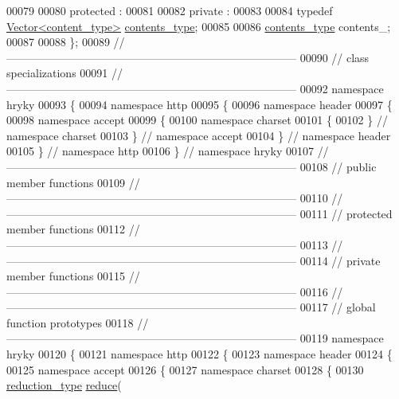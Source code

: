 \begin{DoxyCode}
00079 
00080 \textcolor{keyword}{protected} :
00081 
00082 \textcolor{keyword}{private} :
00083 
00084     \textcolor{keyword}{typedef} \hyperlink{classhryky_1_1_vector}{Vector<content_type>} \hyperlink{classhryky_1_1_vector}{contents_type};
00085 
00086     \hyperlink{classhryky_1_1_vector}{contents_type} contents\_;
00087 
00088 \};
00089 \textcolor{comment}{//
      ------------------------------------------------------------------------------}
00090 \textcolor{comment}{// class specializations}
00091 \textcolor{comment}{//
      ------------------------------------------------------------------------------}
00092 \textcolor{keyword}{namespace }hryky
00093 \{
00094 \textcolor{keyword}{namespace }http
00095 \{
00096 \textcolor{keyword}{namespace }header
00097 \{
00098 \textcolor{keyword}{namespace }accept
00099 \{
00100 \textcolor{keyword}{namespace }charset
00101 \{
00102 \} \textcolor{comment}{// namespace charset}
00103 \} \textcolor{comment}{// namespace accept}
00104 \} \textcolor{comment}{// namespace header}
00105 \} \textcolor{comment}{// namespace http}
00106 \} \textcolor{comment}{// namespace hryky}
00107 \textcolor{comment}{//
      ------------------------------------------------------------------------------}
00108 \textcolor{comment}{// public member functions}
00109 \textcolor{comment}{//
      ------------------------------------------------------------------------------}
00110 \textcolor{comment}{//
      ------------------------------------------------------------------------------}
00111 \textcolor{comment}{// protected member functions}
00112 \textcolor{comment}{//
      ------------------------------------------------------------------------------}
00113 \textcolor{comment}{//
      ------------------------------------------------------------------------------}
00114 \textcolor{comment}{// private member functions}
00115 \textcolor{comment}{//
      ------------------------------------------------------------------------------}
00116 \textcolor{comment}{//
      ------------------------------------------------------------------------------}
00117 \textcolor{comment}{// global function prototypes}
00118 \textcolor{comment}{//
      ------------------------------------------------------------------------------}
00119 \textcolor{keyword}{namespace }hryky
00120 \{
00121 \textcolor{keyword}{namespace }http
00122 \{
00123 \textcolor{keyword}{namespace }header
00124 \{
00125 \textcolor{keyword}{namespace }accept
00126 \{
00127 \textcolor{keyword}{namespace }charset
00128 \{
00130     \hyperlink{namespacehryky_a343a9a4c36a586be5c2693156200eadc}{reduction_type} \hyperlink{namespacehryky_1_1http_a08fc36a78a8e2908140fcd102829a566}{reduce}(

\end{DoxyCode}
